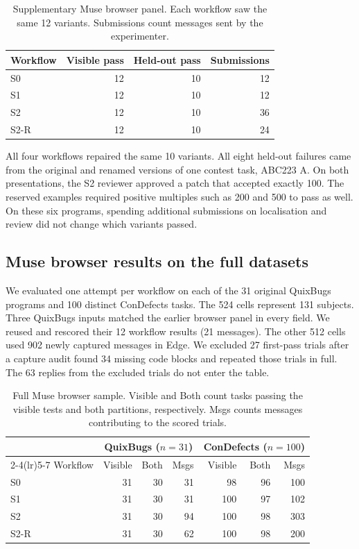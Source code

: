 \documentclass[conference]{IEEEtran}
\begin{document}
\begin{table}[ht]
\centering
\caption{Supplementary Muse browser panel. Each workflow saw the same 12 variants. Submissions count messages sent by the experimenter.}
\begin{tabular}{lrrr}\toprule
Workflow & Visible pass & Held-out pass & Submissions\\\midrule
S0   & 12 & 10 & 12\\
S1   & 12 & 10 & 12\\
S2   & 12 & 10 & 36\\
S2-R & 12 & 10 & 24\\\bottomrule
\end{tabular}
\end{table}
All four workflows repaired the same 10 variants. All eight held-out failures came from the original and renamed versions of one contest task, ABC223 A. On both presentations, the S2 reviewer approved a patch that accepted exactly 100. The reserved examples required positive multiples such as 200 and 500 to pass as well. On these six programs, spending additional submissions on localisation and review did not change which variants passed.

\subsection{Muse browser results on the full datasets}
We evaluated one attempt per workflow on each of the 31 original QuixBugs programs and 100 distinct ConDefects tasks. The 524 cells represent 131 subjects. Three QuixBugs inputs matched the earlier browser panel in every field. We reused and rescored their 12 workflow results (21 messages). The other 512 cells used 902 newly captured messages in Edge. We excluded 27 first-pass trials after a capture audit found 34 missing code blocks and repeated those trials in full. The 63 replies from the excluded trials do not enter the table.

\begin{table}[ht]
\centering
\caption{Full Muse browser sample. Visible and Both count tasks passing the visible tests and both partitions, respectively. Msgs counts messages contributing to the scored trials.}
\label{tab:muse-full}
\begin{tabular}{lrrrrrr}\toprule
& \multicolumn{3}{c}{QuixBugs ($n=31$)} & \multicolumn{3}{c}{ConDefects ($n=100$)}\\
\cmidrule(lr){2-4}\cmidrule(lr){5-7}
Workflow & Visible & Both & Msgs & Visible & Both & Msgs\\\midrule
S0   & 31 & 30 & 31 & 98 & 96 & 100\\
S1   & 31 & 30 & 31 & 100 & 97 & 102\\
S2   & 31 & 30 & 94 & 100 & 98 & 303\\
S2-R & 31 & 30 & 62 & 100 & 98 & 200\\\bottomrule
\end{tabular}
\end{table}
\end{document}
